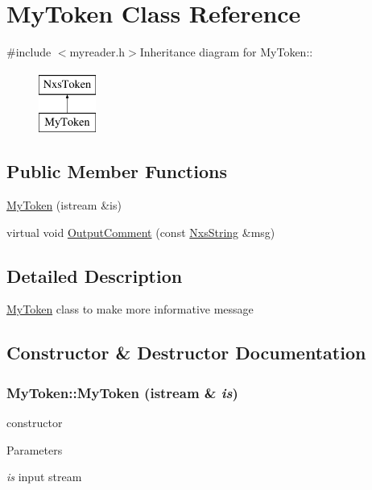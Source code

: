 \hypertarget{classMyToken}{
\section{MyToken Class Reference}
\label{classMyToken}
}


{\ttfamily \#include $<$myreader.h$>$}Inheritance diagram for MyToken::\begin{figure}[H]
\begin{center}
\leavevmode
\includegraphics[height=2cm]{classMyToken}
\end{center}
\end{figure}
\subsection*{Public Member Functions}
\begin{DoxyCompactItemize}
\item 
\hyperlink{classMyToken_a617868499b04824c4ca84ba74cd7fc09}{MyToken} (istream \&is)
\item 
virtual void \hyperlink{classMyToken_a8b9a7b1c600e6d836c3f8e18a54cc71e}{OutputComment} (const \hyperlink{classNxsString}{NxsString} \&msg)
\end{DoxyCompactItemize}


\subsection{Detailed Description}
\hyperlink{classMyToken}{MyToken} class to make more informative message 

\subsection{Constructor \& Destructor Documentation}
\hypertarget{classMyToken_a617868499b04824c4ca84ba74cd7fc09}{
\subsubsection[{MyToken}]{\setlength{\rightskip}{0pt plus 5cm}MyToken::MyToken (istream \& {\em is})}}
\label{classMyToken_a617868499b04824c4ca84ba74cd7fc09}
constructor 
\begin{DoxyParams}{Parameters}
\item[{\em is}]input stream \end{DoxyParams}


